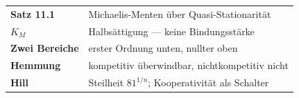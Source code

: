 \begin{merksatz}
\begin{center}
\renewcommand{\arraystretch}{1.5}
\begin{tabular}{@{}P{3.0cm}P{5.6cm}@{}}
\toprule
\textbf{Satz 11.1} & Michaelis-Menten über Quasi-Stationarität\\
\textbf{$K_M$} & Halbsättigung --- keine Bindungsstärke\\
\textbf{Zwei Bereiche} & erster Ordnung unten, nullter oben\\
\textbf{Hemmung} & kompetitiv überwindbar, nichtkompetitiv nicht\\
\textbf{Hill} & Steilheit $81^{1/n}$; Kooperativität als Schalter\\
\bottomrule
\end{tabular}
\end{center}

\begin{center}
\begin{minipage}{0.88\textwidth}
\end{minipage}
\end{center}
\end{merksatz}
